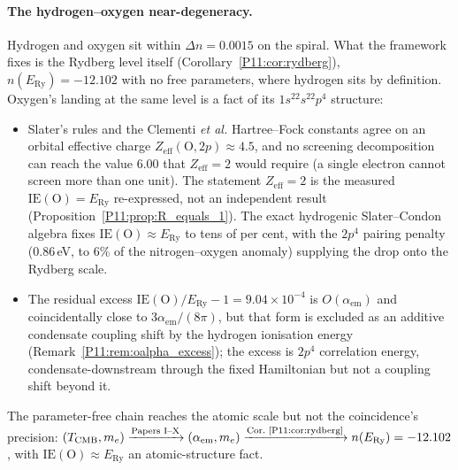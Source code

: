 \documentclass[11pt,a4paper]{article}
\theoremstyle{definition}
\theoremstyle{remark}
\newcommand{\TCMB}{T_{\mathrm{CMB}}}
\newcommand{\ERy}{E_{\mathrm{Ry}}}
\newcommand{\aem}{\alpha_{\mathrm{em}}}
\newcommand{\IE}{\mathrm{IE}}
\begin{document}
\paragraph{The hydrogen--oxygen near-degeneracy.}
Hydrogen and oxygen sit within $\Delta n = 0.0015$ on the spiral.
What the framework fixes is the Rydberg level itself
(Corollary~\ref{P11:cor:rydberg}), $n(\ERy) = -12.102$ with no free
parameters, where hydrogen sits by definition.  Oxygen's landing at
the same level is a fact of its $1s^22s^22p^4$ structure:
\begin{itemize}[noitemsep]
\item Slater's rules and the Clementi \emph{et al.} Hartree--Fock
  constants agree on an orbital effective charge
  $Z_\mathrm{eff}(\mathrm{O},2p)\approx4.5$, and no screening
  decomposition can reach the value $6.00$ that
  $Z_\mathrm{eff}=2$ would require (a single electron cannot screen
  more than one unit).  The statement $Z_\mathrm{eff}=2$ is the
  measured $\IE(\mathrm{O})=\ERy$ re-expressed, not an independent
  result (Proposition~\ref{P11:prop:R_equals_1}).  The exact hydrogenic
  Slater--Condon algebra fixes $\IE(\mathrm{O})\approx\ERy$ to tens of
  per cent, with the $2p^4$ pairing penalty ($0.86\,$eV, to $6\%$ of
  the nitrogen--oxygen anomaly) supplying the drop onto the Rydberg
  scale.
\item The residual excess $\IE(\mathrm{O})/\ERy - 1 = 9.04\times10^{-4}$
  is $O(\aem)$ and coincidentally close to $3\aem/(8\pi)$, but that
  form is excluded as an additive condensate coupling shift by the
  hydrogen ionisation energy (Remark~\ref{P11:rem:oalpha_excess}); the
  excess is $2p^4$ correlation energy, condensate-downstream through
  the fixed Hamiltonian but not a coupling shift beyond it.
\end{itemize}
The parameter-free chain reaches the atomic scale but not the
coincidence's precision:
$(\TCMB,m_e)\xrightarrow{\text{Papers I--X}}(\aem,m_e)
\xrightarrow{\text{Cor.~\ref{P11:cor:rydberg}}}n(\ERy)=-12.102$,
with $\IE(\mathrm{O})\approx\ERy$ an atomic-structure fact.
\end{document}
